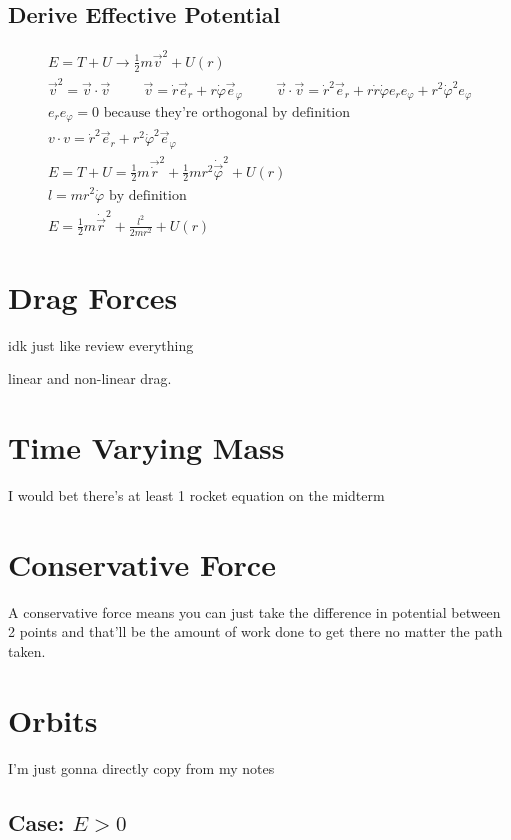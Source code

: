 \documentclass[fleqn]{article}
\newcommand{\hp}{\hspace{1cm}}
\newcommand{\equations} [1] {
\begin{gather*}
#1
\end{gather*}
}
\begin{document}
\subsection{Derive Effective Potential}
\equations{
    E = T + U \rightarrow 
    \frac{1}{2} m \vec v^2 + U(r)
    \\
    \vec v^2 = \vec v \cdot \vec v 
    \hp 
    \vec v = \dot r \vec e_r + r \dot \varphi \vec e_\varphi
    \hp 
    \vec v \cdot \vec v = \dot r^2 \vec e_r + r \dot r \dot \varphi e_r e_\varphi + r^2 \dot \varphi^2 e_\varphi
    \\
    e_r e_\varphi = 0 \textrm{ because they're orthogonal by definition}
    \\
    v \cdot v = \dot r^2 \vec e_r + r^2 \dot \varphi^2 \vec e_\varphi
    \\
    E = T + U = \frac{1}{2} m \vec \dot r^2  + \frac{1}{2} mr^2 \dot {\vec \varphi}^2 + U(r)
    \\
    l = mr^2 \dot \varphi \textrm{ by definition}
    \\
    E = \frac{1}{2} m {\dot \vec r}^2 + \frac{l^2}{2mr^2} + U(r)
}

\section{Drag Forces}
idk just like review everything 

linear and non-linear drag. 

\section{Time Varying Mass}
I would bet there's at least 1 rocket equation on the midterm 

\section{Conservative Force}
A conservative force means you can just take the difference in potential between 2 points and that'll be the amount of work done to get there no matter the path taken. 

\section{Orbits}
I'm just gonna directly copy from my notes
\subsection{Case: $E > 0$}
\end{document}
